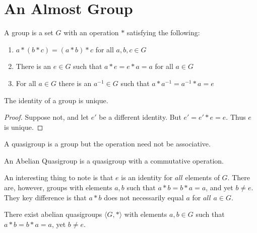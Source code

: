 \documentclass[crop=false,class=book,oneside]{standalone}
\begin{document}
        \section{An Almost Group}
            \begin{definition}
            A group is a set $G$ with an operation $*$ satisfying the following:
            \begin{enumerate}
                \item $a*(b*c) = (a*b)*c$ for all $a,b,c\in G$
                \item There is an $e\in G$ such that $a*e=e*a = a$ for all $a\in G$
                \item For all $a\in G$ there is an $a^{-1}\in G$ such that $a*a^{-1}=a^{-1}*a = e$
            \end{enumerate}
            \end{definition}
            \begin{theorem}
            The identity of a group is unique.
            \end{theorem}
            \begin{proof}
            Suppose not, and let $e'$ be a different identity. But $e' = e'*e = e$. Thus $e$ is unique.
            \end{proof}
            \begin{definition}
            A quasigroup is a group but the operation need not be associative.
            \end{definition}
            \begin{definition}
            An Abelian Quasigroup is a quasigroup with a commutative operation.
            \end{definition}
            An interesting thing to note is that $e$ is an identity for $all$ elements of $G$. There are, however, groups with elements $a,b$ such that $a*b = b*a = a$, and yet $b\ne e$. They key difference is that $a*b$ does not necessarily equal $a$ for $all$ $a\in G$. 
            \begin{theorem}
            There exist abelian quasigroups $\langle G,*\rangle$ with elements $a,b\in G$ such that $a*b = b*a = a$, yet $b\ne e$.
            \end{theorem}
\end{document}
